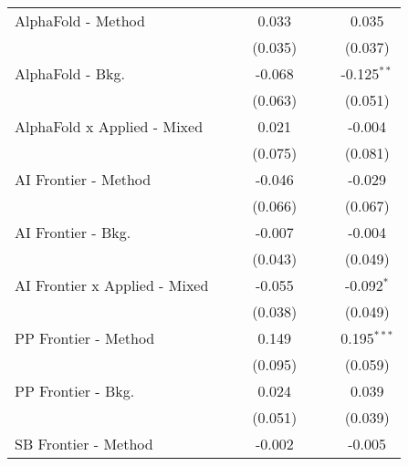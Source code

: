 \begin{tabular}{lcccccc}
   AlphaFold - Method             &             &         & 0.033          &              &              & 0.035\\   
                                  &             &         & (0.035)        &              &              & (0.037)\\   
   AlphaFold - Bkg.               &             &         & -0.068         &              &              & -0.125$^{**}$\\   
                                  &             &         & (0.063)        &              &              & (0.051)\\   
   AlphaFold x Applied - Mixed    &             &         & 0.021          &              &              & -0.004\\   
                                  &             &         & (0.075)        &              &              & (0.081)\\   
   AI Frontier - Method           &             &         & -0.046         &              &              & -0.029\\   
                                  &             &         & (0.066)        &              &              & (0.067)\\   
   AI Frontier - Bkg.             &             &         & -0.007         &              &              & -0.004\\   
                                  &             &         & (0.043)        &              &              & (0.049)\\   
   AI Frontier x Applied - Mixed  &             &         & -0.055         &              &              & -0.092$^{*}$\\   
                                  &             &         & (0.038)        &              &              & (0.049)\\   
   PP Frontier - Method           &             &         & 0.149          &              &              & 0.195$^{***}$\\   
                                  &             &         & (0.095)        &              &              & (0.059)\\   
   PP Frontier - Bkg.             &             &         & 0.024          &              &              & 0.039\\   
                                  &             &         & (0.051)        &              &              & (0.039)\\   
   SB Frontier - Method           &             &         & -0.002         &              &              & -0.005\\   

\end{tabular}
